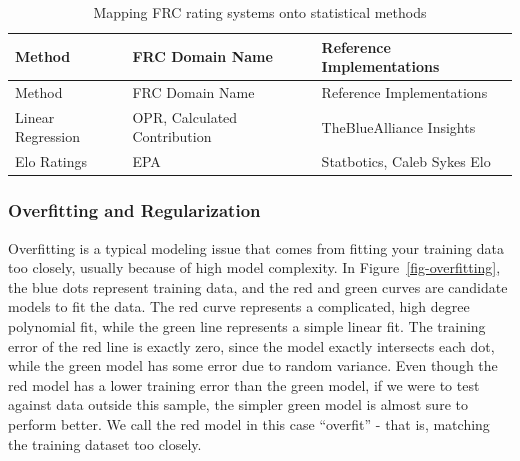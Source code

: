 \documentclass[
  12pt]{article}
\begin{document}
\begin{longtable}[]{@{}
  >{\raggedright\arraybackslash}p{}
  >{\raggedright\arraybackslash}p{}
  >{\raggedright\arraybackslash}p{}@{}}
\caption{Mapping FRC rating systems onto statistical
methods}\label{tbl-methods}\tabularnewline
\toprule\noalign{}
\begin{minipage}[b]{\linewidth}\raggedright
Method
\end{minipage} & \begin{minipage}[b]{\linewidth}\raggedright
FRC Domain Name
\end{minipage} & \begin{minipage}[b]{\linewidth}\raggedright
Reference Implementations
\end{minipage} \\
\midrule\noalign{}
\endfirsthead
\toprule\noalign{}
\begin{minipage}[b]{\linewidth}\raggedright
Method
\end{minipage} & \begin{minipage}[b]{\linewidth}\raggedright
FRC Domain Name
\end{minipage} & \begin{minipage}[b]{\linewidth}\raggedright
Reference Implementations
\end{minipage} \\
\midrule\noalign{}
\endhead
\bottomrule\noalign{}
\endlastfoot
Linear Regression & OPR, Calculated Contribution & TheBlueAlliance
Insights \\
Elo Ratings & EPA & Statbotics, Caleb Sykes Elo \\
\end{longtable}

\subsubsection{Overfitting and
Regularization}\label{overfitting-and-regularization}

Overfitting is a typical modeling issue that comes from fitting your
training data too closely, usually because of high model complexity. In
Figure~\ref{fig-overfitting}, the blue dots represent training data, and
the red and green curves are candidate models to fit the data. The red
curve represents a complicated, high degree polynomial fit, while the
green line represents a simple linear fit. The training error of the red
line is exactly zero, since the model exactly intersects each dot, while
the green model has some error due to random variance. Even though the
red model has a lower training error than the green model, if we were to
test against data outside this sample, the simpler green model is almost
sure to perform better. We call the red model in this case ``overfit'' -
that is, matching the training dataset too closely.
\end{document}
